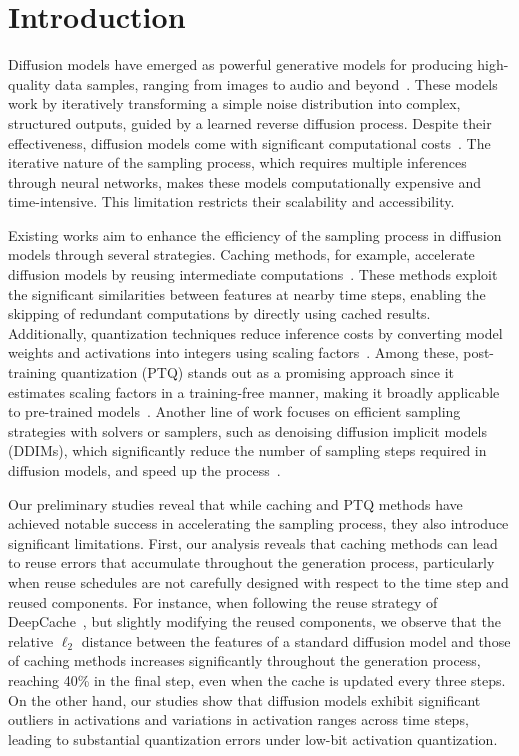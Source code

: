 \section{Introduction}
\label{sec:intro}

Diffusion models have emerged as powerful generative models for producing high-quality data samples, ranging from images to audio and beyond~\citep{ho2020denoising, song2020denoising, song2020score}. These models work by iteratively transforming a simple noise distribution into complex, structured outputs, guided by a learned reverse diffusion process. Despite their effectiveness, diffusion models come with significant computational costs~\citep{liu2022pseudo, li2023q}. The iterative nature of the sampling process, which requires multiple inferences through neural networks, makes these models computationally expensive and time-intensive. This limitation restricts their scalability and accessibility.

Existing works aim to enhance the efficiency of the sampling process in diffusion models through several strategies. Caching methods, for example, accelerate diffusion models by reusing intermediate computations~\citep{ma2024deepcache, wimbauer2024cache}. These methods exploit the significant similarities between features at nearby time steps, enabling the skipping of redundant computations by directly using cached results. Additionally, quantization techniques reduce inference costs by converting model weights and activations into integers using scaling factors~\citep{nagel2021white, yang2019quantization}. Among these, post-training quantization (PTQ) stands out as a promising approach since it estimates scaling factors in a training-free manner, making it broadly applicable to pre-trained models~\citep{li2021brecq}. Another line of work focuses on efficient sampling strategies with solvers or samplers, such as denoising diffusion implicit models (DDIMs), which significantly reduce the number of sampling steps required in diffusion models, and speed up the process~\citep{song2020denoising}.

Our preliminary studies reveal that while caching and PTQ methods have achieved notable success in accelerating the sampling process, they also introduce significant limitations. First, our analysis reveals that caching methods can lead to reuse errors that accumulate throughout the generation process, particularly when reuse schedules are not carefully designed with respect to the time step and reused components. For instance, when following the reuse strategy of DeepCache~\citep{ma2024deepcache}, but slightly modifying the reused components, we observe that the relative $\ell_2$ distance between the features of a standard diffusion model and those of caching methods increases significantly throughout the generation process, reaching 40\% in the final step, even when the cache is updated every three steps. On the other hand, our studies show that diffusion models exhibit significant outliers in activations and variations in activation ranges across time steps, leading to substantial quantization errors under 
low-bit activation quantization. 

